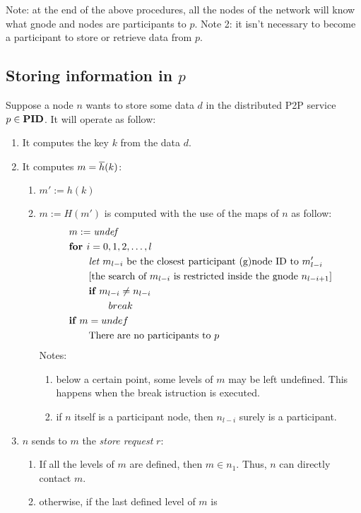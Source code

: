 \documentclass[a4paper]{article}
\newcommand{\T}[1]{\textrm{#1}}
\newcommand{\eal}[1]{{\begin{align*} #1 \end{align*}}}
\newcommand{\qq}{\qquad}
\theoremstyle{definition}
\begin{document}
Note: at the end of the above procedures, all the nodes of the network will
know what gnode and nodes are participants to $p$.
Note 2: it isn't necessary to become a participant to store or retrieve data
from $p$.

\subsection{Storing information in $p$}
\label{storeinfop}
Suppose a node $n$ wants to store some data $d$ in the distributed P2P service
$p\in \textbf{PID}$. It will operate as follow:
\begin{enumerate}
	\item It computes the key $k$ from the data $d$.
	\item It computes $m={{\overline{h}}}(k)$:
		\begin{enumerate}
			\item $m':=h(k)$
			\item $m:=H(m')$ is computed with the use of the maps
				of $n$ as follow: 
				\eal{
				&m:=\emph{undef}\\
				&\textbf{for }i=0,1,2,\dots,l\\
				&\qq \emph{let }m_{l-i} \T{ be the closest
				participant (g)node ID to } m'_{l-i}\\
				&\qq \T{[the search of $m_{l-i}$ is restricted
				inside the gnode $n_{l-i+1}$]}\\
				&\qq \textbf{if } m_{l-i} \neq  n_{l-i}\\
				&\qq\qq break\\
				&\textbf{if } m=undef\\
				&\qq \T{There are no participants to $p$}
				}
				Notes:
				\begin{enumerate}
					\item below a certain point, some levels
						of $m$ may be left undefined. This happens
						when the break istruction is
						executed.
					\item if $n$ itself is a participant
						node, then $n_{l-i}$ surely is a
						participant.
				\end{enumerate}
		\end{enumerate}
	\item $n$ sends to $m$ the \emph{store request} $r$:
		\begin{enumerate}
			\item If all the levels of $m$ are defined, then $m\in
				n_1$. Thus, $n$ can directly contact $m$.
			\item otherwise, if the last defined level of $m$ is

\end{enumerate}
\end{enumerate}
\end{document}
